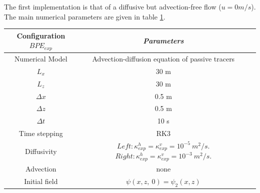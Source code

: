 The first implementation is that of a diffusive but advection-free flow ($u=0m/s$). The main numerical parameters are given in table \ref{tab_NUMLAB_exp}.

\begin{table}[h]
        \centering
        \begin{tabular}{|c|c|c|}
                \hline
                Configuration $BPE_{exp}$ & \textit{Parameters}\\
                \hline 
                Numerical Model & Advection-diffusion equation of passive tracers\\
                $L_x$ & 30 m\\
                $L_z$ & 30 m\\
                $\Delta x$ & 0.5 m\\
                $\Delta z$ & 0.5 m\\
                $\Delta t$ & 10 s\\
                Time stepping & RK3 \\
                Diffusivity & $Left: \kappa_{exp}^h=\kappa_{exp}^v=10^{-5}\ m^2/s$. $Right: \kappa_{exp}^h=\kappa_{exp}^v=10^{-3}\ m^2/s$. \\
                Advection & none\\
                Initial field & $\psi(x, z,\ 0)=\psi_2(x,z)$\\
                \hline
        \end{tabular}
        \label{tab_NUMLAB_exp}
\end{table}
